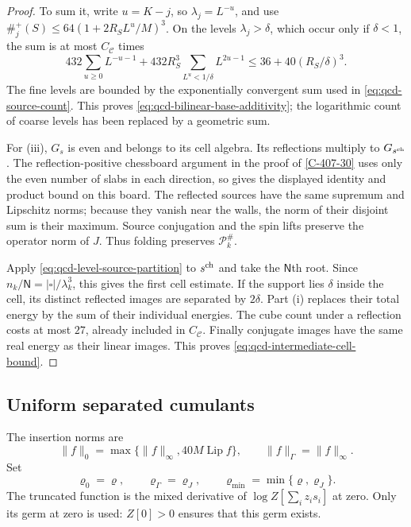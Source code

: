 \documentclass[11pt,letterpaper,reqno]{amsart}
\theoremstyle{definition}
\theoremstyle{remark}
\begin{document}
\begin{proof}
To sum it, write $u=K-j$, so $\lambda_j=L^{-u}$, and use
$\#_j^+(S)\le64(1+2R_SL^u/M)^3$. On the levels
$\lambda_j>\delta$, which occur only if $\delta<1$, the sum
is at most $C_{\mathscr C}$ times
\[
 432\sum_{u\ge0}L^{-u-1}
 +432R_S^3\sum_{L^u<1/\delta}L^{2u-1}
 \le36+40(R_S/\delta)^3.
\]
The fine levels are bounded by the exponentially convergent
sum used in \eqref{eq:qcd-source-count}. This proves
\eqref{eq:qcd-bilinear-base-additivity}; the logarithmic
count of coarse levels has been replaced by a geometric sum.

For \textup{(iii)}, $G_s$ is even and belongs to its cell
algebra. Its reflections multiply to $G_{s^{\rm ch}}$.
The reflection-positive chessboard argument in the proof of
\cref{C-407-30} uses only the even number of slabs in each
direction, so gives the displayed identity and product bound
on this board. The reflected sources have the same supremum
and Lipschitz norms; because they vanish near the walls, the
norm of their disjoint sum is their maximum. Source conjugation
and the spin lifts preserve the operator norm of $J$.
Thus folding preserves $\mathcal P_k^\#$.

Apply \eqref{eq:qcd-level-source-partition} to $s^{\rm ch}$
and take the $\mathsf N$th root. Since
$n_k/\mathsf N=|\square|/\lambda_k^3$, this gives the first
cell estimate. If the support lies $\delta$ inside the cell,
its distinct reflected images are separated by $2\delta$.
Part \textup{(i)} replaces their total energy by the sum of
their individual energies. The cube count under a reflection
costs at most $27$, already included in $C_{\mathscr C}$.
Finally conjugate images have the same real energy as their
linear images. This proves \eqref{eq:qcd-intermediate-cell-bound}.
\end{proof}

\subsection{Uniform separated cumulants}

The insertion norms are
\[
 \|f\|_0=\max\{\|f\|_\infty,40M\operatorname{Lip}f\},
 \qquad \|f\|_\Gamma=\|f\|_\infty.
\]
Set
\[
 \varrho_0=\varrho,\qquad \varrho_\Gamma=\varrho_J,\qquad
 \varrho_{\min}=\min\{\varrho,\varrho_J\}.
\]
The truncated function is the mixed derivative of
$\log Z[\sum_i z_is_i]$ at zero. Only its germ at zero is
used: $Z[0]>0$ ensures that this germ exists.
\end{document}
